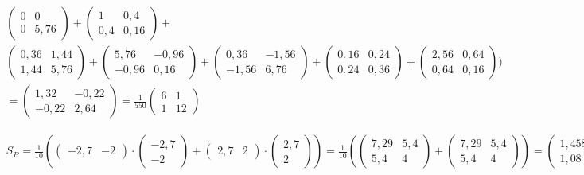 \documentclass[a4paper,parskip=full-]{article}
\begin{document}
\begin{multline*}
\begin{pmatrix} 0 & 0 \\ 0 & 5,76 \end{pmatrix} +
\begin{pmatrix} 1 & 0,4 \\ 0,4 & 0,16 \end{pmatrix} + \\
\begin{pmatrix} 0,36 & 1,44 \\ 1,44 & 5,76 \end{pmatrix} +
\begin{pmatrix} 5,76 & -0,96 \\ -0,96 & 0,16 \end{pmatrix} +
\begin{pmatrix} 0,36 & -1,56 \\ -1,56 & 6,76 \end{pmatrix} +
\begin{pmatrix} 0,16 & 0,24 \\ 0,24 & 0,36 \end{pmatrix} +
\begin{pmatrix} 2,56 & 0,64 \\ 0,64 & 0,16 \end{pmatrix} \Biggr) \\
= \begin{pmatrix} 
1,32 & -0,22 \\ 
-0,22 & 2,64
\end{pmatrix} = \frac{1}{550}
\begin{pmatrix} 
6 & 1 \\ 1 & 12
\end{pmatrix}
\end{multline*}

\begin{multline*}
S_B = \frac{1}{10}\left(  
\begin{pmatrix} -2,7 &  -2 \end{pmatrix} \cdot
\begin{pmatrix} -2,7 \\ -2 \end{pmatrix} +
\begin{pmatrix} 2,7 &  2 \end{pmatrix} \cdot
\begin{pmatrix} 2,7 \\ 2 \end{pmatrix}
\right)
= \frac{1}{10}\left( 
\begin{pmatrix} 7,29 & 5,4 \\ 5,4 & 4 \end{pmatrix} +
\begin{pmatrix} 7,29 & 5,4 \\ 5,4 & 4 \end{pmatrix}
\right)
= \begin{pmatrix} 1,458 & 1,08 \\ 1,08 & 0,8 \end{pmatrix}
\end{multline*}
\end{document}
